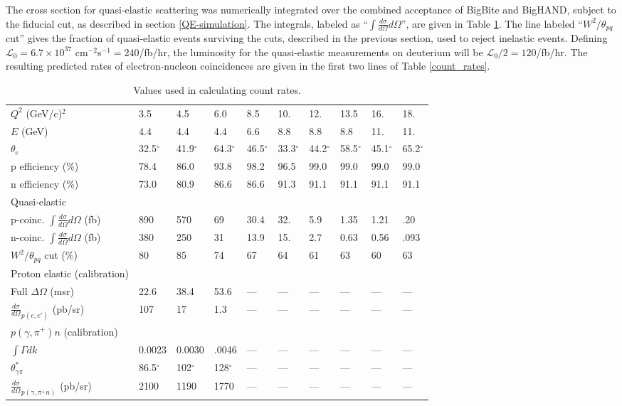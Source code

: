 \documentclass[12pt,letterpaper,oneside]{article}
\begin{document}
The cross section for quasi-elastic scattering was numerically
integrated over the combined acceptance of BigBite and BigHAND,
subject to the fiducial cut, as described in section \ref{QE-simulation}.
The integrals, labeled as ``$\int \frac{d\sigma}{d\Omega} d\Omega$'', 
 are given in Table \ref{rates_input}.  
The line labeled ``$W^2/\theta_{pq}$ cut'' gives the fraction of quasi-elastic
events surviving the cuts, described in the previous section, used  to reject
inelastic events.
 Defining 
$\mathcal{L}_0=6.7\times 10^{37}$  cm$^{-2}$s$^{-1}=240$/fb/hr, the luminosity
for the quasi-elastic measurements on deuterium will be
$\mathcal{L}_0/2=120$/fb/hr.
The resulting predicted rates of electron-nucleon coincidences are
given in the first two lines of Table \ref{count_rates}.
\begin{table}
\begin{center}
\caption{
Values used in calculating count rates.
\label{rates_input}}
\vspace{.2in}
{\begin{tabular}{|l|l|l|l|l|l|l|l|l|l|}
\hline
$Q^2$ (GeV/c)$^2$&3.5& 4.5&6.0&8.5&10.&12.&13.5&16.&18.\\
$E$ (GeV)&4.4&4.4&4.4&6.6&8.8&8.8&8.8&11.&11.\\
$\theta_e$&32.5$^\circ$&
41.9$^\circ$&64.3$^\circ$&46.5$^\circ$&33.3$^\circ$&44.2$^\circ$
&58.5$^\circ$&45.1$^\circ$&65.2$^\circ$\\
\hline
\hline
p efficiency (\%)&78.4&86.0&93.8&98.2&96.5&99.0&99.0&99.0&99.0\\
\hline
n efficiency (\%)&73.0&80.9&86.6&86.6&91.3&91.1&91.1&91.1&91.1\\
\hline
\hline
Quasi-elastic\\
\hline
p-coinc. $\int \frac{d\sigma}{d\Omega} d\Omega$ (fb)&
890&570&69&30.4&32.&5.9&1.35&1.21&.20\\
\hline
n-coinc. $\int \frac{d\sigma}{d\Omega} d\Omega$ (fb)&
380&250&31&13.9&15.&2.7&0.63&0.56&.093\\
\hline
$W^2/\theta_{pq}$ cut (\%)&80&85&74&67&64&61&63&60&63\\
\hline
\hline
Proton elastic (calibration)\\
\hline
Full $\Delta\Omega$ (msr)&22.6&38.4&53.6&---&---&---&---&---&---\\
\hline
$\frac{d\sigma}{d\Omega}_{p(e,e')}$ (pb/sr)&107&17&1.3&---&---&---&---&---&---\\
\hline
\hline
$p(\gamma,\pi^+)n$ (calibration)\\
\hline
$\int \Gamma dk$&0.0023&0.0030&.0046&---&---&---&---&---&---\\
\hline
$\theta^*_{\gamma\pi}$&86.5$^\circ$&102$^\circ$&128$^\circ$&---&---&---&---&---&---\\
\hline
$\frac{d\sigma}{d\Omega}_{p(\gamma,\pi^+n)}$ (pb/sr)&2100&1190&1770&---&---&---&---&---&---\\
\hline
\end{tabular}}
\end{center}
\end{table}
\end{document}
